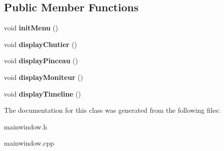 \subsection*{\-Public \-Member \-Functions}
\begin{DoxyCompactItemize}
\item 
\hypertarget{classmain_window_adb3a411d0c54b5d4f080326347e7ce5e}{void {\bfseries init\-Menu} ()}\label{classmain_window_adb3a411d0c54b5d4f080326347e7ce5e}

\item 
\hypertarget{classmain_window_a7aae51e2fdfc9fc1afab53e046416140}{void {\bfseries display\-Chutier} ()}\label{classmain_window_a7aae51e2fdfc9fc1afab53e046416140}

\item 
\hypertarget{classmain_window_a1d2a0ce69fbeff21f7eab4deaf97d767}{void {\bfseries display\-Pinceau} ()}\label{classmain_window_a1d2a0ce69fbeff21f7eab4deaf97d767}

\item 
\hypertarget{classmain_window_a7211fb7071fd19754a87cfff71be712e}{void {\bfseries display\-Moniteur} ()}\label{classmain_window_a7211fb7071fd19754a87cfff71be712e}

\item 
\hypertarget{classmain_window_a37c7daf9d40917684830763578963112}{void {\bfseries display\-Timeline} ()}\label{classmain_window_a37c7daf9d40917684830763578963112}

\end{DoxyCompactItemize}


\-The documentation for this class was generated from the following files\-:\begin{DoxyCompactItemize}
\item 
mainwindow.\-h\item 
mainwindow.\-cpp\end{DoxyCompactItemize}
